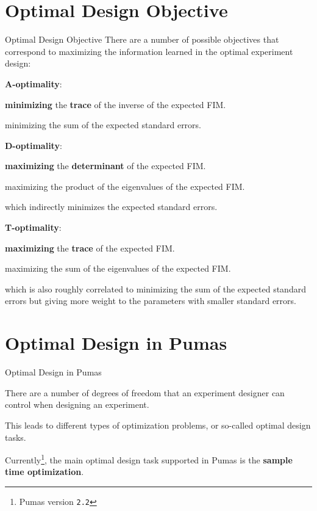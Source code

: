 \documentclass[aspectratio=169]{beamer}                    %
\begin{document}
\section{Optimal Design Objective}
\begin{frame}{Optimal Design Objective}
	\small
	There are a number of possible objectives that correspond to maximizing the
	information learned in the optimal experiment design:
	\begin{vfilleditems}
		\item \textbf{A-optimality}:
		\begin{vfilleditems}
			\item \textbf{minimizing} the \textbf{trace} of the inverse of the expected FIM.
			\item minimizing the sum of the expected standard errors.
		\end{vfilleditems}
		\item \textbf{D-optimality}:
		\begin{vfilleditems}
			\item \textbf{maximizing} the \textbf{determinant} of the expected FIM.
			\item maximizing the product of the eigenvalues of the expected FIM.
			\item which indirectly minimizes the expected standard errors.
		\end{vfilleditems}
		\item \textbf{T-optimality}:
		\begin{vfilleditems}
			\item \textbf{maximizing} the \textbf{trace} of the expected FIM.
			\item maximizing the sum of the eigenvalues of the expected FIM.
			\item which is also roughly correlated to minimizing the
			sum of the expected standard errors but giving more weight
			to the parameters with smaller standard errors.
		\end{vfilleditems}
	\end{vfilleditems}
\end{frame}

\section{Optimal Design in Pumas}
\begin{frame}{Optimal Design in Pumas}
	\begin{vfilleditems}
		\item There are a number of degrees of freedom that an experiment designer can
		control when designing an experiment.
		\item This leads to different types of optimization problems,
		or so-called optimal design tasks.
		\item Currently\footnote{Pumas version \texttt{2.2}},
		the main optimal design task supported in Pumas is the
		\textbf{sample time optimization}.
	\end{vfilleditems}
\end{frame}
\end{document}
